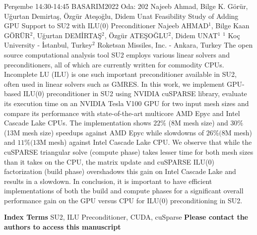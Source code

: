 
    \begin{abstract_basarim}
    {Perşembe 14:30-14:45}
    {BASARIM2022}
    {Oda: 202}
    {Najeeb Ahmad, Bilge K. Görür, Uğurtan Demirtaş, Özgür Ateşoğlu, Didem Unat}
    {Feasibility Study of Adding GPU Support to SU2 with ILU(0) Preconditioner}
    {%
    Najeeb AHMAD$^{1}$, Bilge Kaan GÖRÜR$^{2}$, Uğurtan DEMİRTAŞ$^{2}$, Özgür ATEŞOĞLU$^{2}$, Didem UNAT$^{1}$}
    {%
    }
    {%
    $^1$ Koç University - İstanbul, Turkey\newline{}$^2$ Roketsan Missiles, Inc. - Ankara, Turkey}
    The open source computational analysis tool SU2 employs various linear solvers and preconditioners, all of which are currently written for commodity CPUs. Incomplete LU (ILU) is one such important preconditioner available in SU2, often used in linear solvers such as GMRES. In this work, we implement GPU-based ILU(0) preconditioner in SU2 using NVIDIA cuSPARSE library, evaluate its execution time on an NVIDIA Tesla V100 GPU for two input mesh sizes and compare its performance with state-of-the-art multicore AMD Epyc and Intel Cascade Lake CPUs. The implementation shows $22 \%$ (8M mesh size) and $30 \%$ (13M mesh size) speedups against AMD Epyc while slowdowns of $26 \%(8 \mathrm{M}$ mesh) and $11 \%(13 \mathrm{M}$ mesh) against Intel Cascade Lake CPU. We observe that while the cuSPARSE triangular solve (compute phase) takes lesser time for both mesh sizes than it takes on the CPU, the matrix update and cuSPARSE ILU(0) factorization (build phase) overshadows this gain on Intel Cascade Lake and results in a slowdown. In conclusion, it is important to have efficient implementations of both the build and compute phases for a significant overall performance gain on the GPU versus CPU for ILU(0) preconditioning in SU2. 
    
            \textbf{Index Terms} \newline{}SU2, ILU Preconditioner, CUDA, cuSparse
    \newline\newline\noindent \bfseries{Please contact the authors to access this manuscript}
    \end{abstract_basarim}
    